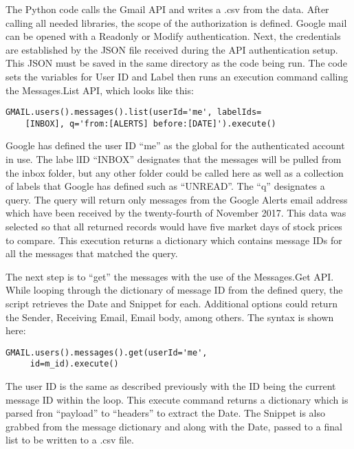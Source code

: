 \documentclass[sigconf]{acmart}
\begin{document}
The Python code calls the Gmail API and writes a .csv from the data. After calling all needed libraries, the scope of the authorization is defined. Google mail can be opened with a Readonly or Modify authentication. Next, the credentials are established by the JSON file received during the API authentication setup. This JSON must be saved in the same directory as the code being run. The code sets the variables for User ID and Label then runs an execution command calling the  Messages.List API, which looks like this:
\begin{verbatim}
GMAIL.users().messages().list(userId='me', labelIds=
	[INBOX], q='from:[ALERTS] before:[DATE]').execute()
\end{verbatim}
Google has defined the user ID ``me'' as the global for the authenticated account in use. The labe lID ``INBOX'' designates that the messages will be pulled from the inbox folder, but any other folder could be called here as well as a collection of labels that Google has defined such as ``UNREAD''. The ``q'' designates a query. The query will return only messages from the Google Alerts email address which have been received by the twenty-fourth of November 2017. This data was selected so that all returned records would have five market days of stock prices to compare. This execution returns a dictionary which contains message IDs for all the messages that matched the query.

The next step is to ``get'' the messages with the use of the Messages.Get API. While looping through the dictionary of message ID from the defined query, the script retrieves the Date and Snippet for each. Additional options could return the Sender, Receiving Email, Email body, among others. The syntax is shown here:
\begin{verbatim}
GMAIL.users().messages().get(userId='me',
	 id=m_id).execute()
\end{verbatim}
The user ID is the same as described previously with the ID being the current message ID within the loop. This execute command returns a dictionary which is parsed fron ``payload'' to ``headers'' to extract the Date. The Snippet is also grabbed from the message dictionary and along with the Date, passed to a final list to be written to a .csv file. 
\end{document}
